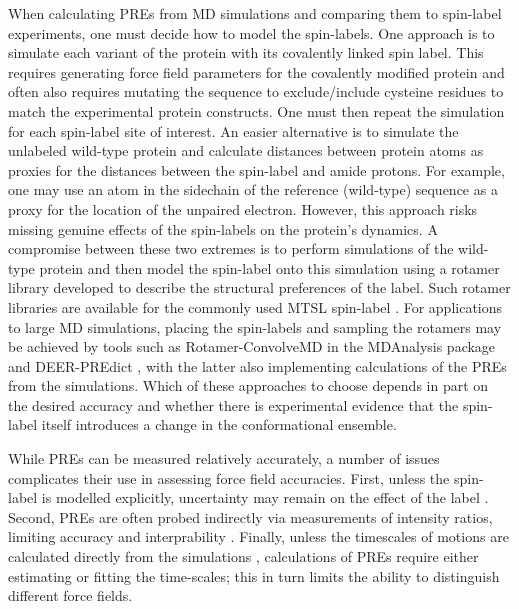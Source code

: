 \documentclass[9pt,review]{livecoms}
\begin{document}
When calculating PREs from MD simulations and comparing them to spin-label experiments, one must decide how to model the spin-labels.
One approach is to simulate each variant of the protein with its covalently linked spin label.
This requires generating force field parameters for the covalently modified protein and often also requires mutating the sequence to exclude/include cysteine residues to match the experimental protein constructs.
One must then repeat the simulation for each spin-label site of interest.
An easier alternative is to simulate the unlabeled wild-type protein and calculate distances between protein atoms as proxies for the distances between the spin-label and amide protons.
For example, one may use an atom in the sidechain of the reference (wild-type) sequence as a proxy for the location of the unpaired electron.
However, this approach risks missing genuine effects of the spin-labels on the protein’s dynamics.
A compromise between these two extremes is to perform simulations of the wild-type protein and then model the spin-label onto this simulation using a rotamer library developed to describe the structural preferences of the label.
Such rotamer libraries are available for the commonly used MTSL spin-label \cite{polyhach_rotamer_2011}.
For applications to large MD simulations, placing the spin-labels and sampling the rotamers may be achieved by tools such as Rotamer-ConvolveMD in the MDAnalysis package \cite{michaud-agrawal_mdanalysis_2011,gowers_mdanalysis_2016} and DEER-PREdict \cite{tesei_deer-predict_2021}, with the latter also implementing calculations of the PREs from the simulations.
Which of these approaches to choose depends in part on the desired accuracy and whether there is experimental evidence that the spin-label itself introduces a change in the conformational ensemble.

While PREs can be measured relatively accurately, a number of issues complicates their use in assessing force field accuracies. First, unless the spin-label is modelled explicitly, uncertainty may remain on the effect of the label \cite{sasmal2017effect,tesei_deer-predict_2021}. Second, PREs are often probed indirectly via measurements of intensity ratios, limiting accuracy and interprability \cite{clore2009theory}. Finally, unless the timescales of motions are calculated directly from the simulations \cite{xue2011motion}, calculations of PREs require either estimating \cite{tesei_deer-predict_2021} or fitting \cite{tesei2021accurate} the time-scales; this in turn limits the ability to distinguish different force fields.
\end{document}

